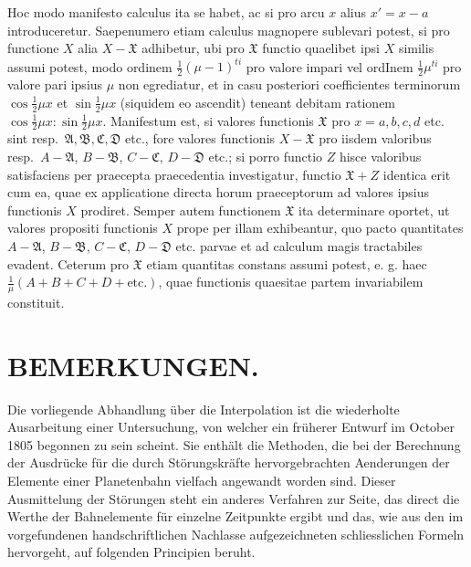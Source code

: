 \documentclass[12pt,a4paper]{article}
\theoremstyle{plain}
\begin{document}
Hoc modo manifesto calculus ita se habet, ac si pro arcu $x$ alius $x' = x - a$ introduceretur. Saepenumero etiam calculus magnopere sublevari potest, si pro
functione $X$ alia $X - \mathfrak{X}$ adhibetur, ubi pro $\mathfrak{X}$ functio quaelibet ipsi
$X$ similis assumi potest, modo ordinem $\frac{1}{2}(\mu - 1)^{ti}$ pro valore impari vel ordInem $\frac{1}{2}\mu^{ti}$ pro valore pari ipsius $\mu$ non egrediatur, et in casu posteriori
coefficientes terminorum $\cos\frac{1}{2}\mu x$ et $\sin\frac{1}{2}\mu x$ (siquidem eo ascendit) teneant debitam rationem $\cos\frac{1}{2}\mu x : \sin\frac{1}{2}\mu x$. Manifestum est, si valores functionis
$\mathfrak{X}$ pro $x = a, b, c, d$ etc. sint resp.\ $\mathfrak{A}, \mathfrak{B}, \mathfrak{C}, \mathfrak{D}$ etc., fore valores functionis $X - \mathfrak{X}$ pro iisdem valoribus resp.\ $A - \mathfrak{A}$,
$B - \mathfrak{B}$, $C - \mathfrak{C}$, $D - \mathfrak{D}$ etc.; si porro functio $Z$ hisce valoribus satisfaciens per praecepta praecedentia investigatur, functio $\mathfrak{X} + Z$
identica erit cum ea, quae ex applicatione directa horum praeceptorum ad valores ipsius functionis $X$ prodiret. Semper autem functionem $\mathfrak{X}$ ita determinare
oportet, ut valores propositi functionis $X$ prope per illam exhibeantur, quo pacto quantitates $A - \mathfrak{A}$, $B - \mathfrak{B}$, $C - \mathfrak{C}$, $D - \mathfrak{D}$ etc. parvae
et ad calculum magis tractabiles evadent. Ceterum pro $\mathfrak{X}$ etiam quantitas constans assumi potest, e. g. haec $\frac{1}{\mu}(A + B + C + D + \text{etc.})$, quae functionis
quaesitae partem invariabilem constituit.


\newpage
\section*{BEMERKUNGEN.}

Die vorliegende Abhandlung über die Interpolation ist die wiederholte Ausarbeitung einer Untersuchung, von welcher ein früherer Entwurf im October 1805 begonnen zu
sein scheint. Sie enthält die Methoden, die bei der Berechnung der Ausdrücke für die durch Störungskräfte hervorgebrachten Aenderungen der Elemente einer Planetenbahn
vielfach angewandt worden sind. Dieser Ausmittelung der Störungen steht ein anderes Verfahren zur Seite, das direct die Werthe der Bahnelemente für einzelne
Zeitpunkte ergibt und das, wie aus den im vorgefundenen handschriftlichen Nachlasse aufgezeichneten schliesslichen Formeln hervorgeht, auf folgenden Principien beruht.
\end{document}
